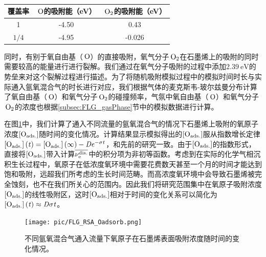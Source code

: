 \begin{table}
    \centering
    \caption{}
    \begin{tabular}{ccc}
        \toprule
        覆盖率  & $\cemb{O}$的吸附能（\si{\electronvolt}） & $\cemb{O2}$的吸附能（\si{\electronvolt}） \\
        \midrule
        1       & -4.50                                    & 0.43                                      \\
        $1 / 4$ & -4.95                                    & -0.026                                    \\
        \bottomrule
    \end{tabular}
    \label{tab:FLG_RSA_coverage}
\end{table}

同时，有别于氧自由基（$\cemb{O}$）的直接吸附，氧气分子$\cemb{O2}$在石墨烯上的吸附的同时需要较高的能量进行进行裂解。我们通过在氧气分子吸附的过程中添加$\SI{2.39}{\electronvolt}$的势垒来对这个裂解过程进行描述。为了将随机吸附模拟过程中的模拟时间时长与实际通入氩氧混合气的时长进行对应，我们根据气体的麦克斯韦-玻尔兹曼分布计算了氧自由基（$\cemb{O}$）和氧气分子$\cemb{O2}$的碰撞频率，气氛中氧自由基（$\cemb{O}$）和氧气分子$\cemb{O2}$的浓度也根据\ref{subsec:FLG_gasPhase}节中的模拟数据进行计算。

在图\ref{fig:FLG_RSA_Oadsorb}中，我们计算了通入不同流量的氩氧混合气的情况下石墨烯上吸附的氧原子浓度$\rm{\left[O_{ads.}\right]} \it$随时间的变化情况。计算结果显示模拟得出的$\rm{\left[O_{ads.}\right]} \it$服从指数增长定律$\rm{\left[O_{ads.}\right]} \it\left(\it t\right)=\rm{\left[O_{ads.}\right]} \it\left(\it \infty \right)-\it De^{\it -\sigma t}$，和先前的研究一致。由于$\rm{\left[O_{ads.}\right]} \it$的指数形式，直接将$\rm{\left[O_{ads.}\right]} \it$带入计算$\overline{\it \nu_{\rm e}^{\rm dis.} \it}$中的积分项为非初等函数。考虑到在实际的化学气相沉积生长过程中，氧原子在低浓度氧环境中需要花费数天甚至一个月的时间才能达到饱和吸附，远超我们所考虑的生长时间范畴。而高浓度氧环境中会导致石墨烯被完全蚀刻，也不在我们所关心的范围内。因此我们将研究范围集中在氧原子吸附浓度$\rm{\left[O_{ads.}\right]} \it$的线性吸附区，这时$\rm{\left[O_{ads.}\right]} \it$相对于时间的变化关系可以简化为$\rm{\left[O_{ads.}\right]} \it\left(\it t\right)\approx \it D \sigma t$。

\begin{figure}[htb]
    \texttt{[image: pic/FLG\_RSA\_Oadsorb.png]}
    \caption{不同氩氧混合气通入流量下氧原子在石墨烯表面吸附浓度随时间的变化情况。}
    \label{fig:FLG_RSA_Oadsorb}
\end{figure}


